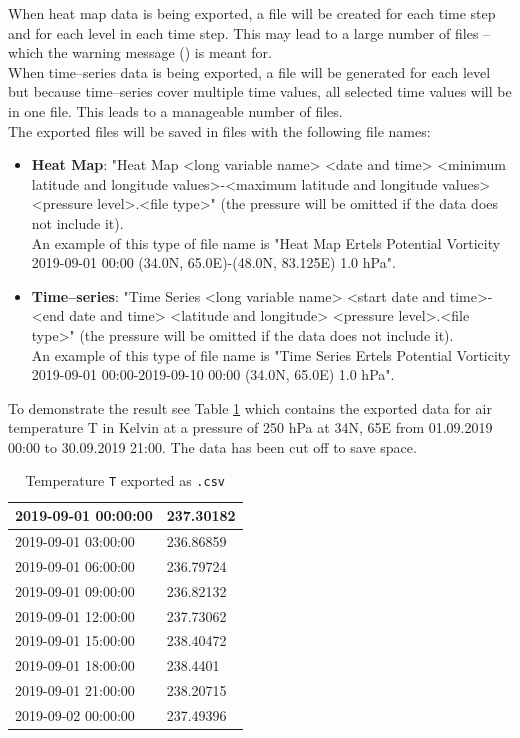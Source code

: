 \documentclass[../00_main.tex]{subfiles}
\begin{document}
When heat map data is being exported, a file will be created for each time step
and for each level in each time step. This may lead to a large number of
files -- which the warning message () is meant for.\\

When time--series data is being exported, a file will be generated for each
level but because time--series cover multiple time values, all selected time 
values will be in one file. This leads to a manageable number of files.\\

The exported files will be saved in files with the following file names:
\begin{itemize}
    \item \textbf{Heat Map}: "Heat Map <long variable name> <date and
        time> <minimum latitude and longitude values>-<maximum latitude and
        longitude values> <pressure level>.<file type>" (the pressure will be
        omitted if the data does not include it).\\
        An example of this type of file name is "Heat Map Ertels Potential 
        Vorticity 2019-09-01 00:00 (34.0N, 65.0E)-(48.0N, 83.125E) 1.0 hPa".
    \item \textbf{Time--series}: "Time Series <long variable name>
        <start date and time>-<end date and time> <latitude and longitude> 
        <pressure level>.<file type>" (the pressure will be
        omitted if the data does not include it).\\
        An example of this type of file name is "Time Series Ertels Potential 
        Vorticity 2019-09-01 00:00-2019-09-10 00:00 (34.0N, 65.0E) 1.0 hPa".
\end{itemize}
To demonstrate the result see Table \ref{tab:de01} which contains the exported
data for air temperature T in Kelvin at a pressure of 250 hPa at 
34\textdegree{}N, 65\textdegree{}E from 01.09.2019 00:00 to 30.09.2019 21:00. 
The data has been cut off to save space.
\begin{table}[H]
\center
    \begin{tabular}{| p{5cm} | p{5cm} |} \hline
        2019-09-01 00:00:00   &  237.30182  \\\hline 
        2019-09-01 03:00:00   &  236.86859  \\\hline
        2019-09-01 06:00:00   &  236.79724  \\\hline
        2019-09-01 09:00:00   &  236.82132  \\\hline
        2019-09-01 12:00:00   &  237.73062  \\\hline
        2019-09-01 15:00:00   &  238.40472  \\\hline
        2019-09-01 18:00:00   &  238.4401   \\\hline
        2019-09-01 21:00:00   &  238.20715  \\\hline
        2019-09-02 00:00:00   &  237.49396  \\\hline
    \end{tabular}
    \caption{Temperature \texttt{T} exported as \texttt{.csv}}
    \label{tab:de01}
\end{table}
\end{document}
